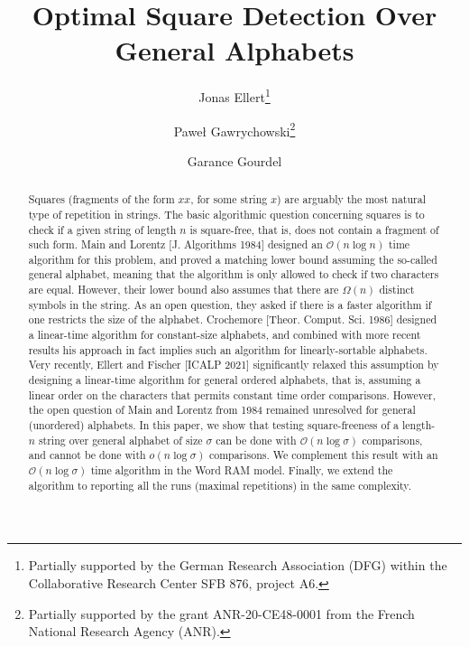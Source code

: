 \documentclass[11pt,letterpaper]{article}
\makeatletter
\newcommand\thankssymb[1]{\textsuperscript{\@fnsymbol{#1}}}
\makeatother
\begin{document}
\title{Optimal Square Detection Over General Alphabets}

\author[1]{Jonas Ellert\thanks{Partially supported by the German Research Association (DFG) within the Collaborative Research Center SFB 876, project A6.}}
\author[2]{Paweł Gawrychowski\thanks{Partially supported by the grant ANR-20-CE48-0001 from the French National Research Agency (ANR).}}
\author[3]{Garance Gourdel\thankssymb{2}}


\date{}

\maketitle

\begin{abstract}
Squares (fragments of the form $xx$, for some string $x$) are arguably the most natural type of repetition in strings.
The basic algorithmic question concerning squares is to check if a given string of length $n$ is square-free, that is, does not contain
a fragment of such form. Main and Lorentz [J. Algorithms 1984] designed an $\mathcal{O}(n\log n)$ time algorithm
for this problem, and proved a matching lower bound assuming the so-called general alphabet, meaning that the algorithm
is only allowed to check if two characters are equal. 
However, their lower bound also assumes that there are $\Omega(n)$ distinct symbols in the string.
As an open question, they asked if there is a faster algorithm if one restricts
the size of the alphabet. Crochemore [Theor. Comput. Sci. 1986] designed a linear-time algorithm for constant-size alphabets,
and combined with more recent results his approach in fact implies such an algorithm for linearly-sortable alphabets.
Very recently, Ellert and Fischer [ICALP 2021] significantly relaxed this assumption by designing a linear-time algorithm for
general ordered alphabets, that is, assuming a linear order on the characters that permits constant time order comparisons. However, the open question of Main and Lorentz
from 1984 remained unresolved for general (unordered) alphabets.  In this paper, we show that testing square-freeness of a length-$n$ string over
general alphabet of size $\sigma$ can be done with $\mathcal{O}(n\log \sigma)$ comparisons, and cannot be done with $o(n\log \sigma)$ comparisons.
We complement this result with an $\mathcal{O}(n\log \sigma)$ time algorithm in the Word RAM model.
Finally, we extend the algorithm to reporting all the runs (maximal repetitions) in the same complexity.
\end{abstract}












\end{document}
